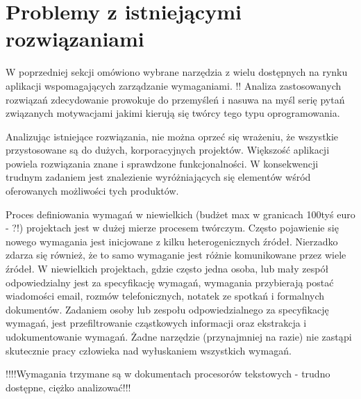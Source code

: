   \section{Problemy z istniejącymi rozwiązaniami}

      W poprzedniej sekcji omówiono wybrane narzędzia z wielu dostępnych na rynku aplikacji wspomagających zarządzanie wymaganiami. !! Analiza zastosowanych rozwiązań zdecydowanie prowokuje do przemyśleń i nasuwa na myśl serię pytań związanych motywacjami jakimi kierują się twórcy tego typu oprogramowania. 

      Analizując istniejące rozwiązania, nie można oprzeć się wrażeniu, że wszystkie przystosowane są do dużych, korporacyjnych projektów. Większość aplikacji powiela rozwiązania znane i sprawdzone funkcjonalności. W konsekwencji trudnym zadaniem jest znalezienie wyróżniających się elementów wśród oferowanych możliwości tych produktów. 

      Proces definiowania wymagań w niewielkich (budżet max w granicach 100tyś euro - ?!) projektach jest w dużej mierze procesem twórczym. Często pojawienie się nowego wymagania jest inicjowane z kilku heterogenicznych źródeł. Nierzadko zdarza się również, że to samo wymaganie jest różnie komunikowane przez wiele źródeł. W niewielkich projektach, gdzie często jedna osoba, lub mały zespół odpowiedzialny jest za specyfikację wymagań, wymagania przybierają postać wiadomości email, rozmów telefonicznych, notatek ze spotkań i formalnych dokumentów. Zadaniem osoby lub zespołu odpowiedzialnego za specyfikację wymagań, jest przefiltrowanie cząstkowych informacji oraz ekstrakcja i udokumentowanie wymagań. Żadne narzędzie (przynajmniej na razie) nie zastąpi skutecznie pracy człowieka nad wyłuskaniem wszystkich wymagań. 

      !!!!Wymagania trzymane są w dokumentach procesorów tekstowych - trudno dostępne, ciężko analizować!!!
